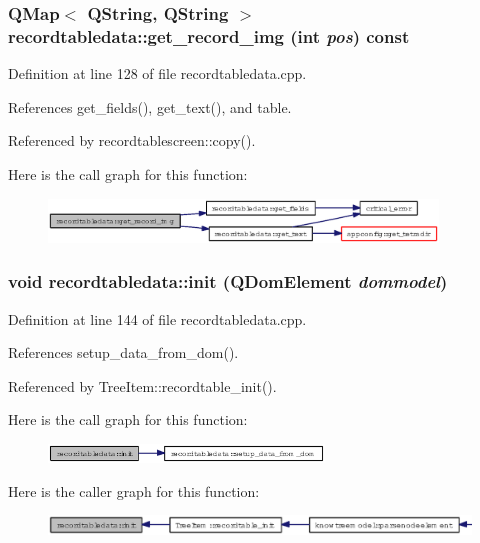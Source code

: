 \subsubsection{\setlength{\rightskip}{0pt plus 5cm}QMap$<$ QString, QString $>$ recordtabledata::get\_\-record\_\-img (int {\em pos}) const}\label{classrecordtabledata_8483238f577c62c4d3a8467acda1636d}




Definition at line 128 of file recordtabledata.cpp.

References get\_\-fields(), get\_\-text(), and table.

Referenced by recordtablescreen::copy().

Here is the call graph for this function:\begin{figure}[H]
\begin{center}
\leavevmode
\includegraphics[width=293pt]{classrecordtabledata_8483238f577c62c4d3a8467acda1636d_cgraph}
\end{center}
\end{figure}
\subsubsection{\setlength{\rightskip}{0pt plus 5cm}void recordtabledata::init (QDom\-Element {\em dommodel})}\label{classrecordtabledata_c8a0b71ad80fbdd4559b9dfe8c6520b3}




Definition at line 144 of file recordtabledata.cpp.

References setup\_\-data\_\-from\_\-dom().

Referenced by Tree\-Item::recordtable\_\-init().

Here is the call graph for this function:\begin{figure}[H]
\begin{center}
\leavevmode
\includegraphics[width=208pt]{classrecordtabledata_c8a0b71ad80fbdd4559b9dfe8c6520b3_cgraph}
\end{center}
\end{figure}


Here is the caller graph for this function:\begin{figure}[H]
\begin{center}
\leavevmode
\includegraphics[width=402pt]{classrecordtabledata_c8a0b71ad80fbdd4559b9dfe8c6520b3_icgraph}
\end{center}
\end{figure}
